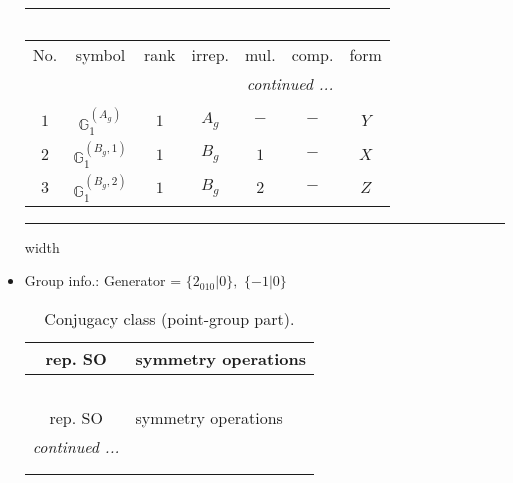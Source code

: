 \documentclass[fleqn,10pt,landscape]{article}
\begin{document}
\begin{itemize}
\begin{center}
\begin{longtable}{ccccccc}
\multicolumn{6}{l}{\tablename\ \thetable{}} \\
 \hline \hline
No. & symbol & rank & irrep. & mul. & comp. & form \\ \hline \endhead

 \hline \hline
\multicolumn{6}{r}{\footnotesize\it continued ...} \\ \endfoot

 \hline \hline
\multicolumn{6}{r}{} \\ \endlastfoot

$ 1 $ & $ \mathbb{G}_{1}^{(A_{g})} $ & $ 1 $ & $ A_{g} $ & $ - $ & $ - $ & $ Y $ \\
$ 2 $ & $ \mathbb{G}_{1}^{(B_{g},1)} $ & $ 1 $ & $ B_{g} $ & $ 1 $ & $ - $ & $ X $ \\
$ 3 $ & $ \mathbb{G}_{1}^{(B_{g},2)} $ & $ 1 $ & $ B_{g} $ & $ 2 $ & $ - $ & $ Z $ \\
\end{longtable}
\end{center}

 \hfil \hrule height 1mm width \textwidth \hfil

\item Group info.: Generator = $\{2{}_{010}|0\},\,\,\{-1|0\}$

\begin{center}
\renewcommand{\arraystretch}{1.3}
\begin{longtable}{c|l}
\caption{Conjugacy class (point-group part).}
 \\
 \hline \hline
rep. SO & symmetry operations \\ \hline \endfirsthead

\multicolumn{1}{l}{\tablename\ \thetable{}} \\
 \hline \hline
rep. SO & symmetry operations \\ \hline \endhead

 \hline \hline
\multicolumn{1}{r}{\footnotesize\it continued ...} \\ \endfoot

 \hline \hline
\multicolumn{1}{r}{} \\ \endlastfoot


\end{longtable}
\end{center}
\end{itemize}
\end{document}

